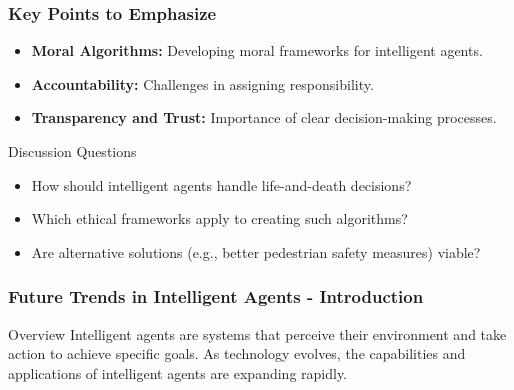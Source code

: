 \documentclass[aspectratio=169]{beamer}
\begin{document}
\begin{frame}[fragile]
    \frametitle{Key Points to Emphasize}
    \begin{itemize}
        \item \textbf{Moral Algorithms:} Developing moral frameworks for intelligent agents.
        \item \textbf{Accountability:} Challenges in assigning responsibility.
        \item \textbf{Transparency and Trust:} Importance of clear decision-making processes.
    \end{itemize}

    \begin{block}{Discussion Questions}
        \begin{itemize}
            \item How should intelligent agents handle life-and-death decisions?
            \item Which ethical frameworks apply to creating such algorithms?
            \item Are alternative solutions (e.g., better pedestrian safety measures) viable?
        \end{itemize}
    \end{block}
\end{frame}

\begin{frame}[fragile]
    \frametitle{Future Trends in Intelligent Agents - Introduction}
    \begin{block}{Overview}
        Intelligent agents are systems that perceive their environment and take action to achieve specific goals. As technology evolves, the capabilities and applications of intelligent agents are expanding rapidly.
    \end{block}
\end{frame}
\end{document}
